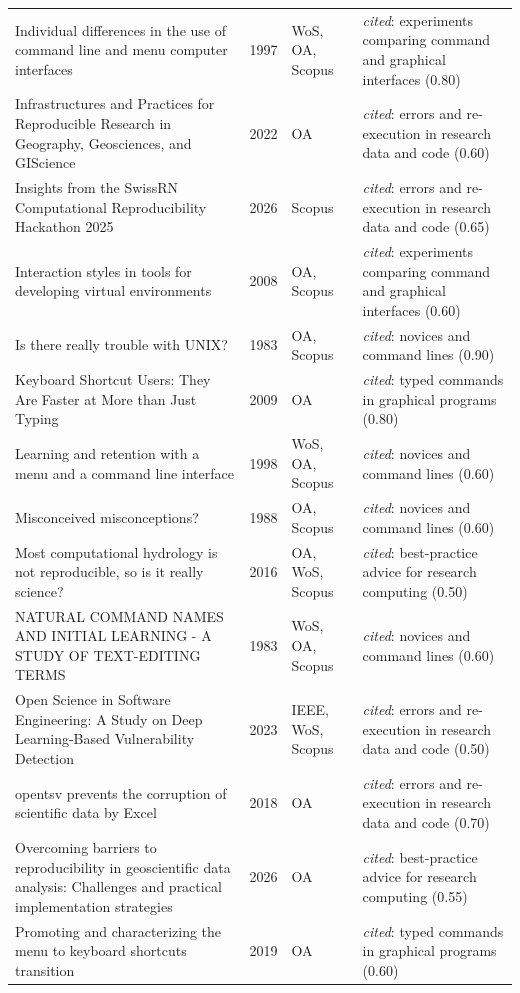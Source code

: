 \begin{longtable}{@{}%
  >{\raggedright\arraybackslash}p{}c%
  >{\raggedright\arraybackslash}p{}%
  >{\raggedright\arraybackslash}p{}@{}}
Individual differences in the use of command line and menu computer interfaces & 1997 & WoS, OA, Scopus & \emph{cited}: experiments comparing command and graphical interfaces (0.80) \\
Infrastructures and Practices for Reproducible Research in Geography, Geosciences, and GIScience & 2022 & OA & \emph{cited}: errors and re-execution in research data and code (0.60) \\
Insights from the SwissRN Computational Reproducibility Hackathon 2025 & 2026 & Scopus & \emph{cited}: errors and re-execution in research data and code (0.65) \\
Interaction styles in tools for developing virtual environments & 2008 & OA, Scopus & \emph{cited}: experiments comparing command and graphical interfaces (0.60) \\
Is there really trouble with UNIX? & 1983 & OA, Scopus & \emph{cited}: novices and command lines (0.90) \\
Keyboard Shortcut Users: They Are Faster at More than Just Typing & 2009 & OA & \emph{cited}: typed commands in graphical programs (0.80) \\
Learning and retention with a menu and a command line interface & 1998 & WoS, OA, Scopus & \emph{cited}: novices and command lines (0.60) \\
Misconceived misconceptions? & 1988 & OA, Scopus & \emph{cited}: novices and command lines (0.60) \\
Most computational hydrology is not reproducible, so is it really science? & 2016 & OA, WoS, Scopus & \emph{cited}: best-practice advice for research computing (0.50) \\
NATURAL COMMAND NAMES AND INITIAL LEARNING - A STUDY OF TEXT-EDITING TERMS & 1983 & WoS, OA, Scopus & \emph{cited}: novices and command lines (0.60) \\
Open Science in Software Engineering: A Study on Deep Learning-Based Vulnerability Detection & 2023 & IEEE, WoS, Scopus & \emph{cited}: errors and re-execution in research data and code (0.50) \\
opentsv prevents the corruption of scientific data by Excel & 2018 & OA & \emph{cited}: errors and re-execution in research data and code (0.70) \\
Overcoming barriers to reproducibility in geoscientific data analysis: Challenges and practical implementation strategies & 2026 & OA & \emph{cited}: best-practice advice for research computing (0.55) \\
Promoting and characterizing the menu to keyboard shortcuts transition & 2019 & OA & \emph{cited}: typed commands in graphical programs (0.60) \\

\end{longtable}
